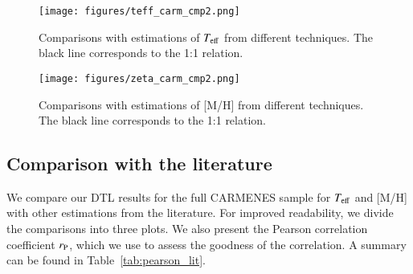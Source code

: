 \documentclass{aa}
\begin{document}
\begin{figure}[]
  \centering
  \texttt{[image: figures/teff\_carm\_cmp2.png]}  
  \caption{Comparisons with estimations of $T_{\rm eff}$ from different techniques. The black line corresponds to the 1:1 relation.}
  \label{fig:dtl_cmp_teff}
\end{figure}

\begin{figure}[]
  \centering
  \texttt{[image: figures/zeta\_carm\_cmp2.png]}  
  \caption{Comparisons with estimations of [M/H] from different techniques. The black line corresponds to the 1:1 relation.}
  \label{fig:dtl_cmp_zeta}
\end{figure}

\subsection{Comparison with the literature}
We compare our DTL results for the full CARMENES sample for $T_{\rm eff}$ and [M/H] with other estimations from the literature. For improved readability, we divide the comparisons into three plots. We also present the Pearson correlation coefficient $r_{\rm P}$, which we use to assess the goodness of the correlation. 
A summary can be found in Table~\ref{tab:pearson_lit}.
\end{document}
